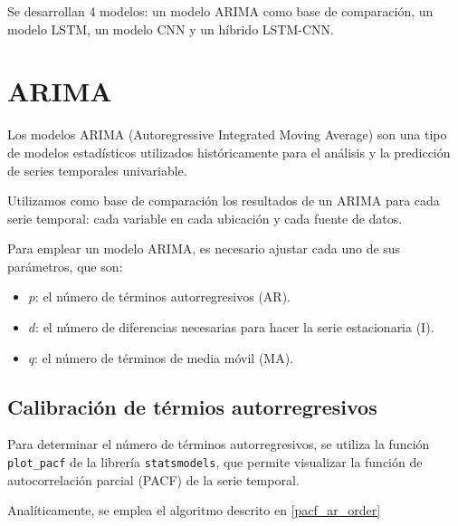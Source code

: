 Se desarrollan 4 modelos: un modelo ARIMA como base de comparación, un modelo LSTM, un modelo CNN y un híbrido LSTM-CNN.

\section{ARIMA}
Los modelos ARIMA (Autoregressive Integrated Moving Average) son una tipo de modelos estadísticos utilizados históricamente para el análisis y la predicción de series temporales
univariable. 

Utilizamos como base de comparación los resultados de un ARIMA para cada serie temporal: cada variable en cada ubicación y cada fuente de datos.

Para emplear un modelo ARIMA, es necesario ajustar cada uno de sus parámetros, que son:
\begin{itemize}
    \item $p$: el número de términos autorregresivos (AR).
    \item $d$: el número de diferencias necesarias para hacer la serie estacionaria (I).
    \item $q$: el número de términos de media móvil (MA).
\end{itemize}

\subsection{Calibración de térmios autorregresivos}
Para determinar el número de términos autorregresivos, se utiliza la función \texttt{plot\_pacf} de la librería \texttt{statsmodels}, 
que permite visualizar la función de autocorrelación parcial (PACF) de la serie temporal.

Analíticamente, se emplea el algoritmo descrito en \ref{pacf_ar_order}

